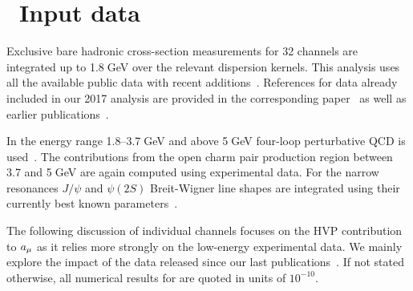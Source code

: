 \section{~Input data}

Exclusive bare hadronic cross-section measurements for 32 channels are integrated up to 1.8$\;$GeV over the relevant dispersion kernels. This analysis uses all the available public data with recent additions~\cite{CMD-3:2017tgb,TheBaBar:2017vzo,Achasov:2017vaq,cleo2017,TheBABAR:2018vvb,Achasov:2018ujw,Lees:2018dnv,cmd3-7pi,Achasov:2019duv,Ivanov:2019crp}. References for data already included in our 2017 analysis are provided in the corresponding paper~\cite{dhmz2017} as well as earlier publications~\cite{dhmz2011,dehz2003}.

In the energy range 1.8--3.7$\;$GeV and above 5$\;$GeV four-loop perturbative QCD is used~\cite{baikov}. The contributions from the open charm pair production region between 3.7 and 5$\;$GeV are again computed using experimental data. For the narrow resonances $J/\psi$ and $\psi(2S)$ Breit-Wigner line shapes are integrated using their currently best known parameters~\cite{pdg}.

The following  discussion of individual channels  focuses on the HVP contribution to $a_\mu$ as it relies more strongly on the low-energy experimental data. We mainly explore the impact of the  data released since our last publications~\cite{dhmz2017,dhmz2011}. If not stated otherwise, all numerical results for \amu are quoted in units of $10^{-10}$.

